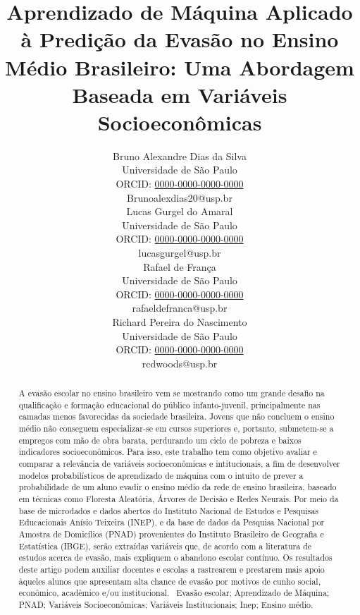 \documentclass[english, spanish, brazilian]{RBIEarticle} %
\title{Aprendizado de Máquina Aplicado à Predição da Evasão no Ensino Médio Brasileiro: Uma Abordagem Baseada em Variáveis Socioeconômicas}
\author{%
	\parbox{3.8cm}{%
		Bruno Alexandre Dias da Silva\\
		Universidade de São Paulo\\
		ORCID: \href{https://orcid.org/0000-0000-0000-0000}{0000-0000-0000-0000}\\
		Brunoalexdias20@usp.br
	}
        \hspace{0.3cm}
	\parbox{3.8cm}{%
		Lucas Gurgel do Amaral\\
		Universidade de São Paulo\\
		ORCID: \href{https://orcid.org/0000-0000-0000-0000}{0000-0000-0000-0000}\\
		lucasgurgel@usp.br
	}
        \hspace{0.3cm}
        \parbox{3.8cm}{%
		Rafael de França\\
		Universidade de São Paulo\\
		ORCID: \href{https://orcid.org/0000-0000-0000-0000}{0000-0000-0000-0000}\\
		rafaeldefranca@usp.br
	}
        \hspace{0.3cm}
	\parbox{3.9cm}{\raggedright%
		Richard Pereira do Nascimento\\
		Universidade de São Paulo\\
		ORCID: \href{https://orcid.org/0000-0000-0000-0000}{0000-0000-0000-0000}\\
		rcdwoods@usp.br
	}
}
\begin{document}
\maketitle

\begin{otherlanguage}{brazilian}
\begin{abstract}
A evasão escolar no ensino brasileiro vem se mostrando como um grande desafio na qualificação e formação educacional do público infanto-juvenil, principalmente nas camadas menos favorecidas da sociedade brasileira. Jovens que não concluem o ensino médio não conseguem especializar-se em cursos superiores e, portanto, submetem-se a empregos com mão de obra barata, perdurando um ciclo de pobreza e baixos indicadores socioeconômicos. Para isso, este trabalho tem como objetivo avaliar e comparar a relevância de variáveis socioeconômicas e intitucionais, a fim de desenvolver modelos probabilísticos de aprendizado de máquina com o intuito de prever a probabilidade de um aluno evadir o ensino médio da rede de ensino brasileira, baseado em técnicas como Floresta Aleatória, Árvores de Decisão e Redes Neurais. Por meio da base de microdados e dados abertos do Instituto Nacional de Estudos e Pesquisas Educacionais Anísio Teixeira (INEP), e da base de dados da Pesquisa Nacional por Amostra de Domicílios (PNAD) provenientes do Instituto Brasileiro de Geografia e Estatística (IBGE), serão extraídas variáveis que, de acordo com a literatura de estudos acerca de evasão, mais expliquem o abandono escolar contínuo. Os resultados deste artigo podem auxiliar docentes e escolas a rastrearem e prestarem mais apoio àqueles alunos que apresentam alta chance de evasão por motivos de cunho social, econômico, acadêmico e/ou institucional.
\keywords\ Evasão escolar; Aprendizado de Máquina; PNAD; Variáveis Socioeconômicas; Variáveis Institucionais; Inep; Ensino médio.
\end{abstract}
\end{otherlanguage}
\end{document}

